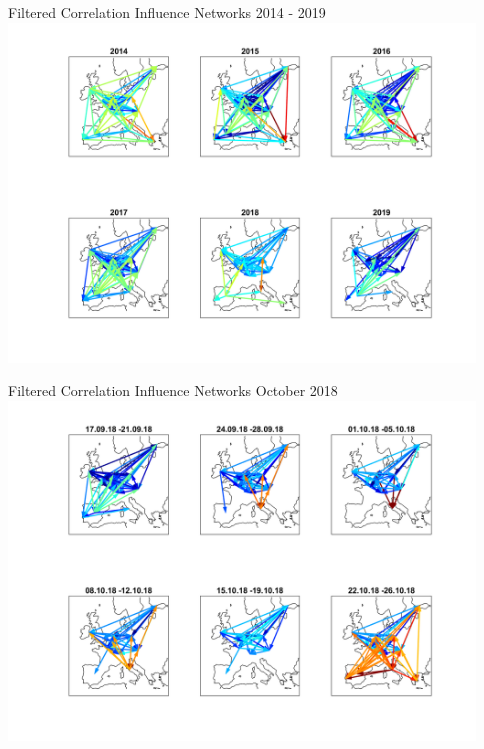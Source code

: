 \documentclass{beamer}
\begin{document}
\begin{frame}{Filtered Correlation Influence Networks 2014 - 2019}
\vspace{-0.0cm}\hspace*{-1cm}\includegraphics[height=9cm]{networks2014-2019}



\end{frame}


\begin{frame}{Filtered Correlation Influence Networks October 2018}
\vspace{-0.0cm}\hspace*{-1cm}\includegraphics[height=9cm]{networks26-10-2018}


\end{frame}
\end{document}
